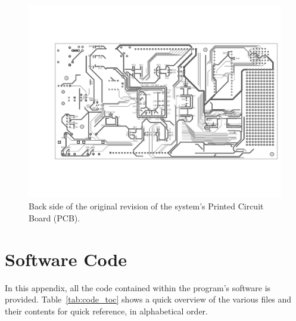 \documentclass[titlepage]{scrartcl}
\begin{document}
\begin{appendices}
	\begin{figure}[h!]
	\vspace{-2cm}
	\centerline{\includegraphics[width=28cm, angle=90, origin=c]{img/pcb_back_old.pdf}}
		\vspace{-2cm}
                	\caption{Back side of the original revision of the system's Printed Circuit Board (PCB).}
               	\label{fig:orig_pcb_2}
	\end{figure}

	\clearpage

	\section{Software Code \label{code}}
	In this appendix, all the code contained within the program's software is provided. Table~\ref{tab:code_toc} shows a quick overview of the various files and their contents for quick reference, in alphabetical order.\\

	\clearpage

	\def\arraystretch{1.5}
	

\end{appendices}
\end{document}
